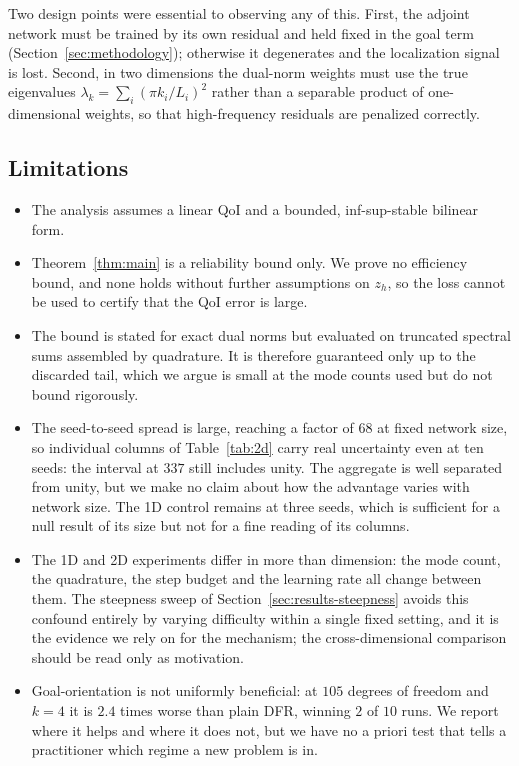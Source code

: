 \documentclass[preprint,11pt]{elsarticle}
\begin{document}
Two design points were essential to observing any of this. First, the adjoint network must be trained by its own residual and held fixed in the goal term (Section~\ref{sec:methodology}); otherwise it degenerates and the localization signal is lost. Second, in two dimensions the dual-norm weights must use the true eigenvalues $\lambda_k = \sum_i (\pi k_i / L_i)^2$ rather than a separable product of one-dimensional weights, so that high-frequency residuals are penalized correctly.

\subsection{Limitations}

\begin{itemize}
    \item The analysis assumes a linear QoI and a bounded, inf-sup-stable bilinear form.
    \item Theorem~\ref{thm:main} is a reliability bound only. We prove no efficiency bound, and none holds without further assumptions on $z_h$, so the loss cannot be used to certify that the QoI error is large.
    \item The bound is stated for exact dual norms but evaluated on truncated spectral sums assembled by quadrature. It is therefore guaranteed only up to the discarded tail, which we argue is small at the mode counts used but do not bound rigorously.
    \item The seed-to-seed spread is large, reaching a factor of $68$ at fixed network size, so individual columns of Table~\ref{tab:2d} carry real uncertainty even at ten seeds: the interval at $337$ still includes unity. The aggregate is well separated from unity, but we make no claim about how the advantage varies with network size. The 1D control remains at three seeds, which is sufficient for a null result of its size but not for a fine reading of its columns.
    \item The 1D and 2D experiments differ in more than dimension: the mode count, the quadrature, the step budget and the learning rate all change between them. The steepness sweep of Section~\ref{sec:results-steepness} avoids this confound entirely by varying difficulty within a single fixed setting, and it is the evidence we rely on for the mechanism; the cross-dimensional comparison should be read only as motivation.
    \item Goal-orientation is not uniformly beneficial: at $105$ degrees of freedom and $k = 4$ it is $2.4$ times worse than plain DFR, winning $2$ of $10$ runs. We report where it helps and where it does not, but we have no a priori test that tells a practitioner which regime a new problem is in.

\end{itemize}
\end{document}
